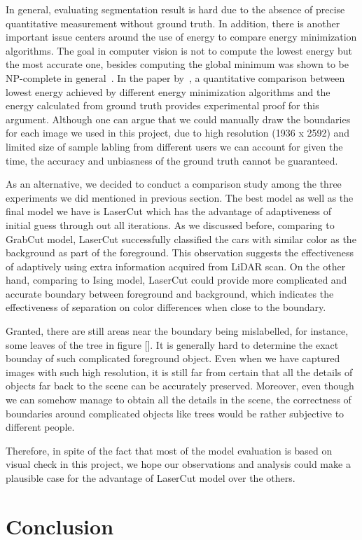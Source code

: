 \documentclass{article} %
\begin{document}
In general, evaluating segmentation result is hard due to the absence of precise quantitative measurement without ground truth. In addition, there is another important issue centers around the use of energy to compare energy minimization algorithms. The goal in computer vision is not to compute the lowest energy but the most accurate one, besides computing the global minimum was shown to be NP-complete in general~\citep{Boykov2001Fast}. In the paper by~\citep{Szeliski2008Comparative}, a quantitative comparison between lowest energy achieved by different energy minimization algorithms and the energy calculated from ground truth provides experimental proof for this argument. Although one can argue that we could manually draw the boundaries for each image we used in this project, due to high resolution (1936 x 2592) and limited size of sample labling from different users we can account for given the time, the accuracy and unbiasness of the ground truth cannot be guaranteed.

As an alternative, we decided to conduct a comparison study among the three experiments we did mentioned in previous section. The best model as well as the final model we have is LaserCut which has the advantage of adaptiveness of initial guess through out all iterations. As we discussed before, comparing to GrabCut model, LaserCut successfully classified the cars with similar color as the background as part of the foreground. This observation suggests the effectiveness of adaptively using extra information acquired from LiDAR scan. On the other hand, comparing to Ising model, LaserCut could provide more complicated and accurate boundary between foreground and background, which indicates the effectiveness of separation on color differences when close to the boundary.

Granted, there are still areas near the boundary being mislabelled, for instance, some leaves of the tree in figure []. It is generally hard to determine the exact bounday of such complicated foreground object. Even when we have captured images with such high resolution, it is still far from certain that all the details of objects far back to the scene can be accurately preserved. Moreover, even though we can somehow manage to obtain all the details in the scene, the correctness of boundaries around complicated objects like trees would be rather subjective to different people.

Therefore, in spite of the fact that most of the model evaluation is based on visual check in this project, we hope our observations and analysis could make a plausible case for the advantage of LaserCut model over the others.

\section{Conclusion}



\end{document}

